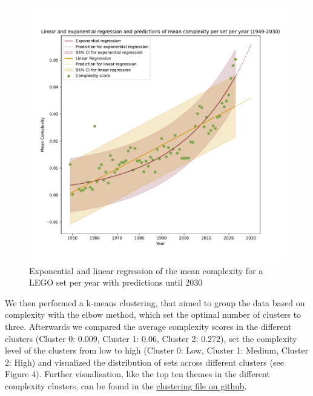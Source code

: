\documentclass{article}
\theoremstyle{plain}
\theoremstyle{definition}
\theoremstyle{remark}
\begin{document}
\begin{figure}[ht]
 \vskip 0.2in
 \begin{center}
 \centerline{\includegraphics[width=\columnwidth]{Images/Regressions.pdf}}
\caption{Exponential and linear regression of the mean complexity for a LEGO set per year with predictions until 2030}
\label{icml-historical}
 \end{center}
 \vskip -0.2in
\end{figure}

We then performed a k-means clustering, that aimed to group the data based on complexity with the elbow method, which set the optimal number of clusters to three. Afterwards we compared the average complexity scores in the different clusters (Cluster 0: $0.009$, Cluster 1: $0.06$, Cluster 2: $0.272$), set the complexity level of the clusters from low to high (Cluster 0: Low, Cluster 1: Medium, Cluster 2: High) and visualized the distribution of sets across different clusters (see Figure 4). Further visualisation, like the top ten themes in the different complexity clusters, can be found in the \href{https://github.com/eddiebeach99/Data_Literacy/blob/main/Analysis/clustering.ipynb}{clustering file on github}.
\end{document}
